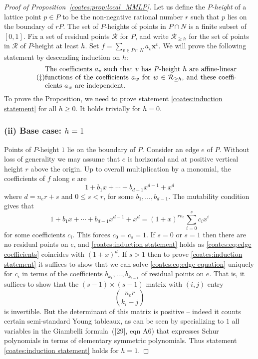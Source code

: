 \begin{proof}[Proof of Proposition~\ref{coates:prop:local_MMLP}]
Let us define the \emph{$P$-height} of a lattice point $p \in P$ to be the non-negative rational number $r$ such that $p$ lies on the boundary of $rP$. The set of $P$-heights of points in $P \cap N$ is a finite subset of $[0,1]$. Fix a set of residual points $\mathcal{R}$ for $P$, and write $\mathcal{R}_{\geq h}$ for the set of points in $\mathcal{R}$ of $P$-height at least $h$. Set $f = \sum_{v \in P \cap N} a_v \bm{x}^v$. We will prove the following statement by descending induction on $h$:
  \begin{equation}
  \tag{$\ddagger$}
  \label{coates:induction statement}
  \begin{minipage}{0.8\textwidth}
    The coefficients $a_v$ such that $v$ has $P$-height $h$ are affine-linear functions of the coefficients $a_w$ for $w \in \mathcal{R}_{\geq h}$, and these coefficients $a_w$ are independent.
  \end{minipage}
  \end{equation}
  \noindent To prove the Proposition, we need to prove statement \eqref{coates:induction statement} for all $h \geq 0$. It holds trivially for $h=0$.

  \subsubsection*{(ii) Base case: $h=1$} Points of $P$-height $1$ lie on the boundary of $P$. Consider an edge $e$ of $P$. Without loss of generality we may assume that $e$ is horizontal and at positive vertical height $r$ above the origin. Up to overall multiplication by a monomial, the coefficients of $f$ along $e$ are
  \begin{equation}
    \label{coates:eq:edge coefficients}
    1 + b_1 x + \cdots + b_{d-1} x^{d-1} + x^d  
  \end{equation}
  where $d = n_e r+s$ and $0 \leq s < r$, for some $b_1,\ldots,b_{d-1}$. The mutability condition gives that 
  \begin{equation}
    \label{coates:eq:edge equation}
    1 + b_1 x + \cdots + b_{d-1} x^{d-1} + x^d = 
    (1+x)^{r n_e} \sum_{i=0}^s c_i x^i
  \end{equation}
  for some coefficients $c_i$. This forces $c_0 = c_s = 1$. If $s = 0$ or $s = 1$ then there are no residual points on $e$, and \eqref{coates:induction statement} holds as \eqref{coates:eq:edge coefficients} coincides with $(1+x)^d$. If $s>1$ then to prove \eqref{coates:induction statement} it suffices to show that we can solve \eqref{coates:eq:edge equation} uniquely for $c_i$ in terms of the coefficients $b_{k_1}, \ldots, b_{k_{s-1}}$ of residual points on $e$. That is, it suffices to show that the $(s-1) \times (s-1)$ matrix with $(i,j)$ entry
  \[
      { n_e r \choose k_i - j}
  \]
  is invertible. But the determinant of this matrix is positive -- indeed it counts certain semi-standard Young tableaux, as can be seen by specializing to $1$ all variables in the Giambelli formula~\textup{([29], eqn A6)} that expresses Schur polynomials in terms of elementary symmetric polynomials. Thus statement \eqref{coates:induction statement} holds for $h=1$. 


\end{proof}
